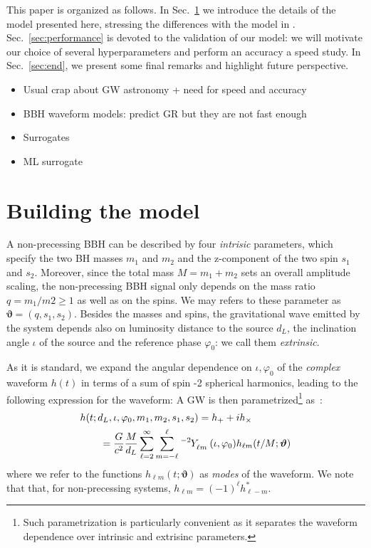 \documentclass[twocolumn,showpacs,preprintnumbers,nofootinbib,prd,
superscriptaddress,10pt]{revtex4-1}
\begin{document}
This paper is organized as follows. In Sec.~\ref{sec:model} we introduce the details of the model presented here, stressing the differences with the model in  \cite{Schmidt:2020yuu}.
Sec.~\ref{sec:performance} is devoted to the validation of our model: we will motivate our choice of several hyperparameters and perform an accuracy a speed study.
In Sec.~\ref{sec:end}, we present some final remarks and highlight future perspective.

\begin{itemize}
	\item Usual crap about GW astronomy + need for speed and accuracy
	\item BBH waveform models: predict GR but they are not fast enough
	\item Surrogates
	\item ML surrogate
\end{itemize}


 \cite{Schmidt:2020yuu}

\section{Building the model}
\label{sec:model}

A non-precessing BBH can be described by four {\it intrisic} parameters, which specify the two BH masses $m_1$ and $m_2$ and the z-component of the two spin $s_1$ and $s_2$.
Moreover, since the total mass $M = m_1 + m_2$ sets an overall amplitude scaling, the non-precessing BBH signal only depends on the mass ratio $q = m_1/m2 \geq 1$ as well as on the spins. We may refers to these parameter as $\boldsymbol{\vartheta} = (q, s_1, s_2)$.
Besides the masses and spins, the gravitational wave emitted by the system depends also on luminosity distance to the source $d_L$, the inclination angle $\iota$ of the source and the reference phase $\varphi_0$: we call them {\it extrinsic}.

As it is standard, we expand the angular dependence on $\iota, \varphi_0$ of the {\it complex} waveform $h(t)$ in terms of a sum of spin -2 spherical harmonics, leading to the following expression for the waveform:
A GW is then parametrized\footnote{Such parametrization is particularly convenient as it separates the waveform dependence over intrinsic and extrisinc parameters.} as~\cite{Estelles:2021gvs}:
\begin{align} \label{eq:h_parametrization}
	&h(t; d_L,\iota,\varphi_0, m_1, m_2, s_1, s_2) = h_+ + i h_\times \nonumber \\
		&\qquad= \frac{G}{c^2} \frac{M}{d_L}\sum_{\ell = 2}^{\infty} \sum_{m = -\ell}^{\ell} \tensor[^{-2}]{Y}{_{\ell m}}(\iota, \varphi_0) h_{\ell m}(t/M; \boldsymbol{\vartheta})
\end{align}
where we refer to the functions $h_{\ell m}(t; \boldsymbol{\vartheta})$ as {\it modes} of the waveform. We note that that, for non-precessing systems, $h_{\ell m} = (-1)^\ell h^*_{\ell -m}$.
\end{document}
